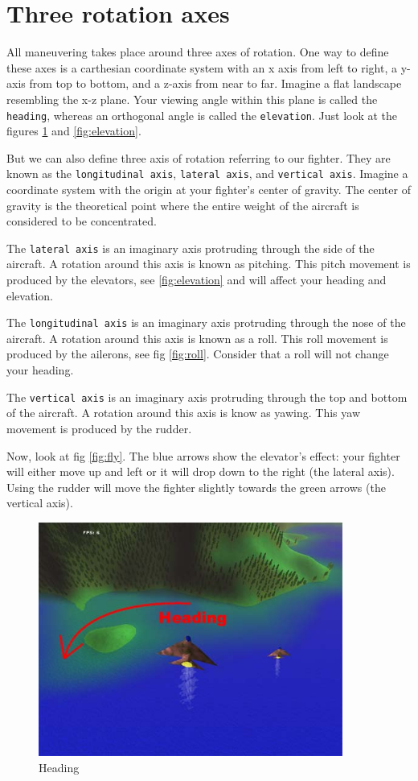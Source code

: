 \section{Three rotation axes}
\label{sec:axis}

All maneuvering takes place around three axes of rotation.
One way to define these axes is a carthesian coordinate system
with an x axis from left to right,
a y-axis from top to bottom, and a z-axis from near to far.
Imagine a flat landscape resembling the x-z plane.
Your viewing angle within this plane is called the \texttt{heading},
whereas an orthogonal angle is called the \texttt{elevation}.
Just look at the figures \ref{fig:heading} and \ref{fig:elevation}.

But we can also define three axis of rotation referring to our fighter.
They are known as the \texttt{longitudinal axis}, \texttt{lateral axis},
and \texttt{vertical axis}.
Imagine a coordinate system with the origin at your fighter's center of gravity.
The center of gravity is the theoretical point where the entire weight
of the aircraft is considered to be concentrated.

The \texttt{lateral axis} is an imaginary axis protruding through the side
of the aircraft. A rotation around this axis is known as pitching.
This pitch movement is produced by the elevators, see \ref{fig:elevation} and
will affect your heading and elevation.

The \texttt{longitudinal axis} is an imaginary axis protruding through
the nose of the aircraft.
A rotation around this axis is known as a roll.
This roll movement is produced by the ailerons, see fig \ref{fig:roll}.
Consider that a roll will not change your heading.

The \texttt{vertical axis} is an imaginary axis protruding through the top and bottom
of the aircraft. A rotation around this axis is know as yawing.
This yaw movement is produced by the rudder.

Now, look at fig \ref{fig:fly}.
The blue arrows show the elevator's effect: your fighter will
either move up and left or it will drop down to the right
(the lateral axis).
Using the rudder will move the fighter slightly towards the green arrows
(the vertical axis).

\begin{figure}
\begin{center}
\includegraphics[width=10cm]{heading.jpg}
\caption{Heading}
\label{fig:heading}
\end{center}
\end{figure}

